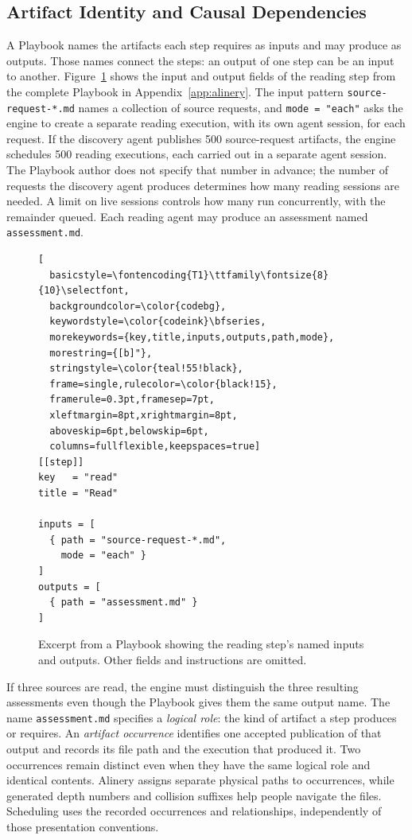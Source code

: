 \documentclass[letterpaper]{article}
\theoremstyle{definition}
\begin{document}
\subsection{Artifact Identity and Causal Dependencies}

A Playbook names the artifacts each step requires as inputs and may produce
as outputs. Those names connect the steps: an output of one step
can be an input to another. Figure~\ref{fig:playbook-read-step}
shows the input and output fields of the reading step from the complete
Playbook in Appendix~\ref{app:alinery}. The input pattern
\texttt{source-request-*.md} names a collection of source requests, and
\texttt{mode = "each"} asks the engine to create a separate reading execution,
with its own agent session, for each request. If the discovery agent publishes
500 source-request artifacts, the engine schedules 500 reading executions,
each carried out in a separate agent session. The Playbook author does not
specify that number in advance; the number of requests the discovery agent
produces determines how many reading sessions are needed. A limit on live
sessions controls how many run concurrently, with the remainder queued.
Each reading agent may produce an assessment named \texttt{assessment.md}.

\begin{figure}[t]
\begin{lstlisting}[
  basicstyle=\fontencoding{T1}\ttfamily\fontsize{8}{10}\selectfont,
  backgroundcolor=\color{codebg},
  keywordstyle=\color{codeink}\bfseries,
  morekeywords={key,title,inputs,outputs,path,mode},
  morestring={[b]"},
  stringstyle=\color{teal!55!black},
  frame=single,rulecolor=\color{black!15},
  framerule=0.3pt,framesep=7pt,
  xleftmargin=8pt,xrightmargin=8pt,
  aboveskip=6pt,belowskip=6pt,
  columns=fullflexible,keepspaces=true]
[[step]]
key   = "read"
title = "Read"

inputs = [
  { path = "source-request-*.md",
    mode = "each" }
]
outputs = [
  { path = "assessment.md" }
]
\end{lstlisting}
\caption{Excerpt from a Playbook showing the reading step's named inputs
and outputs. Other fields and instructions are omitted.}
\label{fig:playbook-read-step}
\end{figure}

If three sources are read, the engine must distinguish the three resulting
assessments even though the Playbook gives them the same output name.
The name \texttt{assessment.md} specifies a \emph{logical role}: the kind of
artifact a step produces or requires. An \emph{artifact occurrence}
identifies one accepted publication of that output and records its file path
and the execution that produced it. Two occurrences remain distinct even
when they have the same logical role and identical contents. Alinery
assigns separate physical paths to occurrences, while generated depth
numbers and collision suffixes help people navigate the files. Scheduling
uses the recorded occurrences and relationships, independently of those
presentation conventions.
\end{document}

